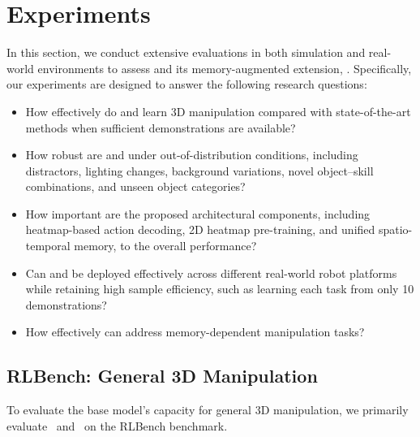 \section{Experiments}
\label{sec:experiments}

In this section, we conduct extensive evaluations in both simulation and
real-world environments to assess \method and its memory-augmented extension,
\memmethod.
Specifically, our experiments are designed to answer the following research
questions:
\begin{itemize}
    \item[Q1:] How effectively do \method and \memmethod learn 3D manipulation
    compared with state-of-the-art methods when sufficient demonstrations are
    available?

    \item[Q2:] How robust are \method and \memmethod under
    out-of-distribution conditions, including distractors, lighting changes,
    background variations, novel object--skill combinations, and unseen
    object categories?

    \item[Q3:] How important are the proposed architectural components,
    including heatmap-based action decoding, 2D heatmap pre-training, and
    unified spatio-temporal memory, to the overall performance?

    \item[Q4:] Can \method and \memmethod be deployed effectively across
    different real-world robot platforms while retaining high sample
    efficiency, such as learning each task from only 10 demonstrations?

    \item[Q5:] How effectively can \memmethod address memory-dependent manipulation tasks?
\end{itemize}

\subsection{RLBench: General 3D Manipulation}
\label{sec:exp:bridgevla}
\label{sec:exp:rlbench}

To evaluate the base model's capacity for general 3D manipulation, we primarily evaluate \method\ and \memmethod\ on the RLBench benchmark.



